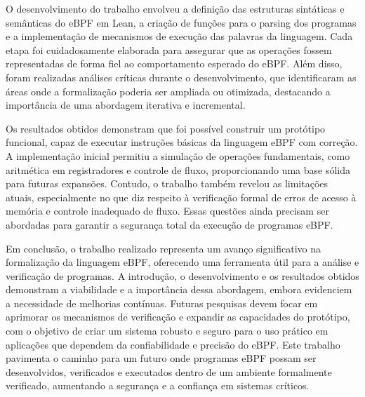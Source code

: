 \documentclass[sigconf]{acmart}
\begin{document}
O desenvolvimento do trabalho envolveu a definição das estruturas sintáticas e semânticas do eBPF em Lean, a criação de funções para o parsing dos programas e a implementação de mecanismos de execução das palavras da linguagem. Cada etapa foi cuidadosamente elaborada para assegurar que as operações fossem representadas de forma fiel ao comportamento esperado do eBPF. Além disso, foram realizadas análises críticas durante o desenvolvimento, que identificaram as áreas onde a formalização poderia ser ampliada ou otimizada, destacando a importância de uma abordagem iterativa e incremental.

Os resultados obtidos demonstram que foi possível construir um protótipo funcional, capaz de executar instruções básicas da linguagem eBPF com correção. A implementação inicial permitiu a simulação de operações fundamentais, como aritmética em registradores e controle de fluxo, proporcionando uma base sólida para futuras expansões. Contudo, o trabalho também revelou as limitações atuais, especialmente no que diz respeito à verificação formal de erros de acesso à memória e controle inadequado de fluxo. Essas questões ainda precisam ser abordadas para garantir a segurança total da execução de programas eBPF.

Em conclusão, o trabalho realizado representa um avanço significativo na formalização da linguagem eBPF, oferecendo uma ferramenta útil para a análise e verificação de programas. A introdução, o desenvolvimento e os resultados obtidos demonstram a viabilidade e a importância dessa abordagem, embora evidenciem a necessidade de melhorias contínuas. Futuras pesquisas devem focar em aprimorar os mecanismos de verificação e expandir as capacidades do protótipo, com o objetivo de criar um sistema robusto e seguro para o uso prático em aplicações que dependem da confiabilidade e precisão do eBPF. Este trabalho pavimenta o caminho para um futuro onde programas eBPF possam ser desenvolvidos, verificados e executados dentro de um ambiente formalmente verificado, aumentando a segurança e a confiança em sistemas críticos.



\end{document}
